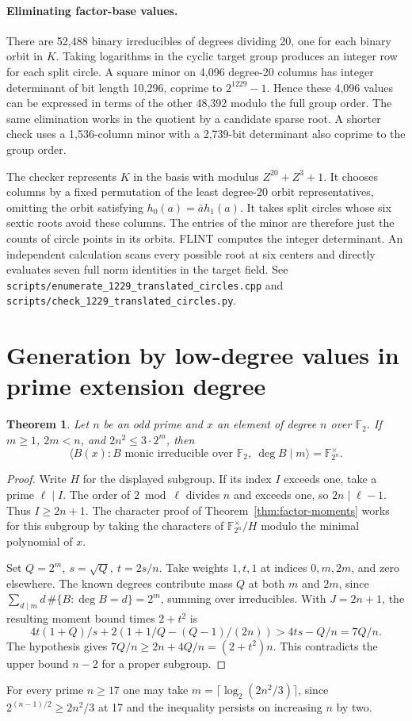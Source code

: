 \documentclass[11pt]{article}
\newtheorem{theorem}{Theorem}
\newcommand{\F}{\mathbb F_2}
\begin{document}
\paragraph{Eliminating factor-base values.}
There are 52,488 binary irreducibles of degrees dividing 20, one for
each binary orbit in \(K\). Taking logarithms in the cyclic target
group produces an integer row for each split circle. A square minor
on 4,096 degree-20 columns has integer determinant of bit length 10,296,
coprime to \(2^{1229}-1\). Hence these 4,096 values can be expressed
in terms of the other 48,392 modulo the full group order. The same
elimination works in the quotient by a candidate sparse root.
A shorter check uses a 1,536-column minor with a 2,739-bit determinant
also coprime to the group order.

The checker represents \(K\) in the basis with modulus \(Z^{20}+Z^3+1\).
It chooses columns by a fixed permutation of the least degree-20 orbit
representatives, omitting the orbit satisfying \(h_0(a)=\bar a h_1(a)\).
It takes split circles whose six sextic roots avoid these columns.
The entries of the minor are therefore just the counts of circle points
in its orbits. FLINT computes the integer determinant. An independent
calculation scans every possible root at six centers and directly
evaluates seven full norm identities in the target field. See
\nolinkurl{scripts/enumerate_1229_translated_circles.cpp} and
\nolinkurl{scripts/check_1229_translated_circles.py}.

\section{Generation by low-degree values in prime extension degree}
\label{sec:prime-factor-generation}
\begin{theorem}
Let \(n\) be an odd prime and \(x\) an element of degree \(n\) over
\(\F\). If \(m\ge1\), \(2m<n\), and \(2n^2\le3\cdot2^m\), then
\[
 \big\langle B(x): B\text{ monic irreducible over }\F,\
                  \deg B\mid m\big\rangle=\mathbb F_{2^n}^{\times}.
\]
\end{theorem}
\begin{proof}
Write \(H\) for the displayed subgroup. If its index \(I\) exceeds
one, take a prime \(\ell\mid I\). The order of \(2\bmod\ell\)
divides \(n\) and exceeds one, so \(2n\mid\ell-1\). Thus \(I\ge2n+1\).
The character proof of Theorem~\ref{thm:factor-moments} works for
this subgroup by taking the characters of \(\mathbb F_{2^n}^\times/H\)
modulo the minimal polynomial of \(x\).

Set \(Q=2^m,\ s=\sqrt Q,\ t=2s/n\). Take weights \(1,t,1\) at
indices \(0,m,2m\), and zero elsewhere. The known degrees contribute
mass \(Q\) at both \(m\) and \(2m\), since
\(\sum_{d\mid m}d\,\#\{B:\deg B=d\}=2^m\), summing over irreducibles.
With \(J=2n+1\), the resulting moment bound times \(2+t^2\) is
\[
 4t(1+Q)/s+2\left(1+1/Q-(Q-1)/(2n)\right)
   >4ts-Q/n=7Q/n .
\]
The hypothesis gives \(7Q/n\ge 2n+4Q/n=(2+t^2)n\). This contradicts
the upper bound \(n-2\) for a proper subgroup.
\end{proof}
For every prime \(n\ge17\) one may take
\(m=\lceil\log_2(2n^2/3)\rceil\), since
\(2^{(n-1)/2}\ge2n^2/3\) at 17 and the inequality persists on
increasing \(n\) by two.
\end{document}
